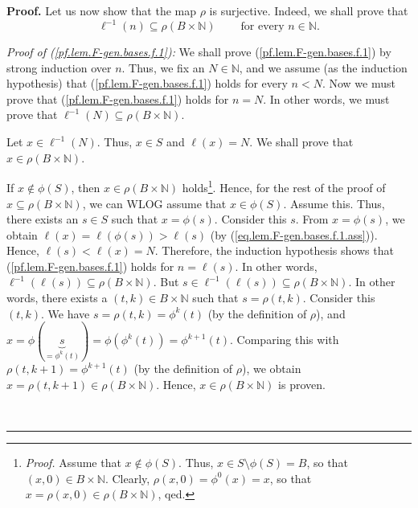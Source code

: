 \documentclass[numbers=enddot,12pt,final,onecolumn,notitlepage]{scrartcl}%
\theoremstyle{definition}
\newenvironment{proof}[1][Proof]{\noindent\textbf{#1.} }{\ \rule{0.5em}{0.5em}}
\begin{document}
\begin{proof}
Let us now show that the map $\rho$ is surjective. Indeed, we shall prove that%
\begin{equation}
\ell^{-1}\left(  n\right)  \subseteq\rho\left(  B\times\mathbb{N}\right)
\ \ \ \ \ \ \ \ \ \ \text{for every }n\in\mathbb{N}.
\label{pf.lem.F-gen.bases.f.1}%
\end{equation}


\textit{Proof of (\ref{pf.lem.F-gen.bases.f.1}):} We shall prove
(\ref{pf.lem.F-gen.bases.f.1}) by strong induction over $n$. Thus, we fix an
$N\in\mathbb{N}$, and we assume (as the induction hypothesis) that
(\ref{pf.lem.F-gen.bases.f.1}) holds for every $n<N$. Now we must prove that
(\ref{pf.lem.F-gen.bases.f.1}) holds for $n=N$. In other words, we must prove
that $\ell^{-1}\left(  N\right)  \subseteq\rho\left(  B\times\mathbb{N}%
\right)  $.

Let $x\in\ell^{-1}\left(  N\right)  $. Thus, $x\in S$ and $\ell\left(
x\right)  =N$. We shall prove that $x\in\rho\left(  B\times\mathbb{N}\right)
$.

If $x\notin\phi\left(  S\right)  $, then $x\in\rho\left(  B\times
\mathbb{N}\right)  $ holds\footnote{\textit{Proof.} Assume that $x\notin%
\phi\left(  S\right)  $. Thus, $x\in S\setminus\phi\left(  S\right)  =B$, so
that $\left(  x,0\right)  \in B\times\mathbb{N}$. Clearly, $\rho\left(
x,0\right)  =\phi^{0}\left(  x\right)  =x$, so that $x=\rho\left(  x,0\right)
\in\rho\left(  B\times\mathbb{N}\right)  $, qed.}. Hence, for the rest of the
proof of $x\subseteq\rho\left(  B\times\mathbb{N}\right)  $, we can WLOG
assume that $x\in\phi\left(  S\right)  $. Assume this. Thus, there exists an
$s\in S$ such that $x=\phi\left(  s\right)  $. Consider this $s$. From
$x=\phi\left(  s\right)  $, we obtain $\ell\left(  x\right)  =\ell\left(
\phi\left(  s\right)  \right)  >\ell\left(  s\right)  $ (by
(\ref{eq.lem.F-gen.bases.f.1.ass})). Hence, $\ell\left(  s\right)
<\ell\left(  x\right)  =N$. Therefore, the induction hypothesis shows that
(\ref{pf.lem.F-gen.bases.f.1}) holds for $n=\ell\left(  s\right)  $. In other
words, $\ell^{-1}\left(  \ell\left(  s\right)  \right)  \subseteq\rho\left(
B\times\mathbb{N}\right)  $. But $s\in\ell^{-1}\left(  \ell\left(  s\right)
\right)  \subseteq\rho\left(  B\times\mathbb{N}\right)  $. In other words,
there exists a $\left(  t,k\right)  \in B\times\mathbb{N}$ such that
$s=\rho\left(  t,k\right)  $. Consider this $\left(  t,k\right)  $. We have
$s=\rho\left(  t,k\right)  =\phi^{k}\left(  t\right)  $ (by the definition of
$\rho$), and $x=\phi\left(  \underbrace{s}_{=\phi^{k}\left(  t\right)
}\right)  =\phi\left(  \phi^{k}\left(  t\right)  \right)  =\phi^{k+1}\left(
t\right)  $. Comparing this with $\rho\left(  t,k+1\right)  =\phi^{k+1}\left(
t\right)  $ (by the definition of $\rho$), we obtain $x=\rho\left(
t,k+1\right)  \in\rho\left(  B\times\mathbb{N}\right)  $. Hence, $x\in
\rho\left(  B\times\mathbb{N}\right)  $ is proven.


\end{proof}
\end{document}
